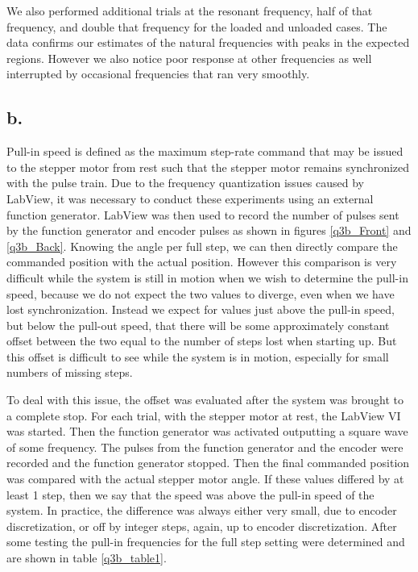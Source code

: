 \documentclass{article}
\theoremstyle{plain}
\theoremstyle{definition}
\theoremstyle{remark}
\begin{document}
We also performed additional trials at the resonant frequency, half of that frequency, and double that frequency for the loaded and unloaded cases.  The data confirms our estimates of the natural frequencies with peaks in the expected regions.  However we also notice poor response at other frequencies as well interrupted by occasional frequencies that ran very smoothly. 

\subsection*{b.}

Pull-in speed is defined as the maximum step-rate command that may be issued to the stepper motor from rest such that the stepper motor remains synchronized with the pulse train.  Due to the frequency quantization issues caused by LabView, it was necessary to conduct these experiments using an external function generator.  LabView was then used to record the number of pulses sent by the function generator and encoder pulses as shown in figures \ref{q3b_Front} and \ref{q3b_Back}.  Knowing the angle per full step, we can then directly compare the commanded position with the actual position.  However this comparison is very difficult while the system is still in motion when we wish to determine the pull-in speed, because we do not expect the two values to diverge, even when we have lost synchronization.  Instead we expect for values just above the pull-in speed, but below the pull-out speed, that there will be some approximately constant offset between the two equal to the number of steps lost when starting up.   But this offset is difficult to see while the system is in motion, especially for small numbers of missing steps.  

To deal with this issue, the offset was evaluated after the system was brought to a complete stop. For each trial, with the stepper motor at rest, the LabView VI was started.  Then the function generator was activated outputting a square wave of some frequency.  The pulses from the function generator and the encoder were recorded and the function generator stopped.  Then the final commanded position was compared with the actual stepper motor angle.  If these values differed by at least 1 step, then we say that the speed was above the pull-in speed of the system.  In practice, the difference was always either very small, due to encoder discretization, or off by integer steps, again, up to encoder discretization.  After some testing the pull-in frequencies for the full step setting were determined and are shown in table \ref{q3b_table1}.
\end{document}
